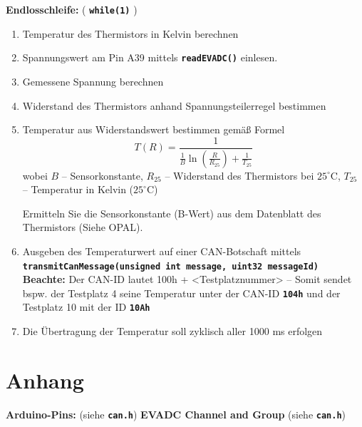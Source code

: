\documentclass[
    fontsize=12pt,                      %
    paper=a4,                           %
    twoside=off,                       %
    DIV=15,                             %
    BCOR=12mm,                          %
    headings=normal,                    %
    headsepline=false,                   %
    footsepline=false,                  %
    headinclude=true,                   %
    footinclude=false,                  %
    toc=listof,                         %
    toc=bib,                            %
    chapterprefix=false,                %
    appendixprefix=false,               %
    numbers=noendperiod,                %
    captions=tableabove,                %
    footnotes=multiple,                 %
    bibliography=oldstyle,              %
    draft=false,                        %
]{scrreprt}
\newcommand{\Farbcode}[1]{\texttt{\textbf{\textcolor{myred}{#1}}}}
\begin{document}
\noindent
\textbf{Endlosschleife:} ( \Farbcode{while(1)} )
\begin{enumerate}
\item Temperatur des Thermistors in Kelvin berechnen
\item Spannungswert am Pin A39 mittels \Farbcode{readEVADC()} einlesen.
\item Gemessene Spannung berechnen
\item Widerstand des Thermistors anhand Spannungsteilerregel bestimmen
\item Temperatur aus Widerstandswert bestimmen gemäß Formel
\begin{equation*}
T(R)=\frac{1}{\frac{1}{B}\ln(\frac{R}{R_{25}})+\frac{1}{T_{25}}} 
\end{equation*}
wobei $B$ -- Sensorkonstante, $R_{25}$ -- Widerstand des Thermistors bei $25^\circ$C, $T_{25}$ -- Temperatur in Kelvin ($25^\circ$C)

Ermitteln Sie die Sensorkonstante (B-Wert) aus dem Datenblatt des Thermistors (Siehe OPAL).
\item Ausgeben des Temperaturwert auf einer CAN-Botschaft mittels \\ \Farbcode{transmitCanMessage(unsigned int message, uint32 messageId)}\\
\textbf{Beachte:} Der CAN-ID lautet 100h + <Testplatznummer> -- Somit sendet bspw. der Testplatz 4 seine Temperatur unter der CAN-ID \texttt{\textbf{104h}} und der Testplatz 10 mit der ID \texttt{\textbf{10Ah}}


\item Die Übertragung der Temperatur soll zyklisch aller 1000 ms erfolgen
\end{enumerate}

\newpage
\section*{Anhang} 
\noindent
\textbf{Arduino-Pins:} (siehe  \Farbcode{can.h})
\textbf{EVADC Channel and Group} (siehe  \Farbcode{can.h})
\end{document}
